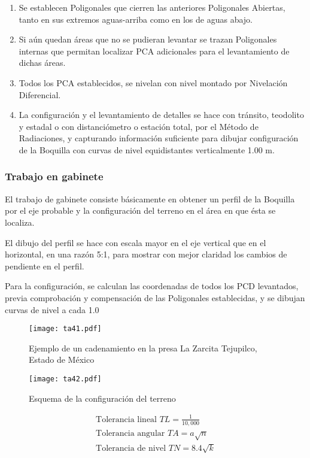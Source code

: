 \begin{enumerate}
    \item Se establecen Poligonales que cierren las anteriores Poligonales Abiertas, tanto en sus extremos aguas-arriba como en los de aguas abajo.
    \item Si aún quedan áreas que no se pudieran levantar se trazan Poligonales internas que permitan localizar PCA adicionales para el levantamiento de dichas áreas.
    \item Todos los PCA establecidos, se nivelan con nivel montado por Nivelación Diferencial.
    \item La configuración y el levantamiento de detalles se hace con tránsito, teodolito y estadal o con distanciómetro o estación total, por el Método de Radiaciones, y capturando información suficiente para dibujar configuración de la Boquilla con curvas de nivel equidistantes verticalmente 1.00 m.
\end{enumerate}

\subsubsection{Trabajo en gabinete}

El trabajo de gabinete consiste básicamente en obtener un perfil de la Boquilla por el eje probable y la configuración del terreno en el área en que ésta se localiza.

El dibujo del perfil se hace con escala mayor en el eje vertical que en el horizontal, en una razón 5:1, para mostrar con mejor claridad los cambios de pendiente en el perfil.

Para la configuración, se calculan las coordenadas de todos los PCD levantados, previa comprobación y compensación de las Poligonales establecidas, y se dibujan curvas de nivel a cada 1.0

\begin{figure}[h!]
\centering
  \texttt{[image: ta41.pdf]}
  \caption{Ejemplo de un cadenamiento en la presa La Zarcita Tejupilco, Estado de México}
  \label{ta41}
\end{figure}
\begin{figure}[h!]
\centering
  \texttt{[image: ta42.pdf]}
  \caption{Esquema de la configuración del terreno}
  \label{ta42}
\end{figure}

\begin{align}
    \text{Tolerancia lineal } TL = \frac{1}{10,000}\\
    \text{Tolerancia angular } TA = a \sqrt{n} \\
    \text{Tolerancia de nivel } TN = 8.4 \sqrt{k} \\
\end{align}

